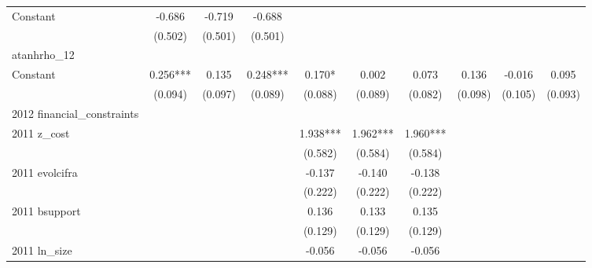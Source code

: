 \begin{table}[htbp]
\begin{tabular}{l*{9}{c}}
Constant            &      -0.686   &      -0.719   &      -0.688   &               &               &               &               &               &               \\
                    &     (0.502)   &     (0.501)   &     (0.501)   &               &               &               &               &               &               \\
\hline
atanhrho\_12         &               &               &               &               &               &               &               &               &               \\
Constant            &       0.256***&       0.135   &       0.248***&       0.170*  &       0.002   &       0.073   &       0.136   &      -0.016   &       0.095   \\
                    &     (0.094)   &     (0.097)   &     (0.089)   &     (0.088)   &     (0.089)   &     (0.082)   &     (0.098)   &     (0.105)   &     (0.093)   \\
\hline
2012 financial\_constraints&               &               &               &               &               &               &               &               &               \\
2011 z\_cost         &               &               &               &       1.938***&       1.962***&       1.960***&               &               &               \\
                    &               &               &               &     (0.582)   &     (0.584)   &     (0.584)   &               &               &               \\
2011 evolcifra      &               &               &               &      -0.137   &      -0.140   &      -0.138   &               &               &               \\
                    &               &               &               &     (0.222)   &     (0.222)   &     (0.222)   &               &               &               \\
2011 bsupport       &               &               &               &       0.136   &       0.133   &       0.135   &               &               &               \\
                    &               &               &               &     (0.129)   &     (0.129)   &     (0.129)   &               &               &               \\
2011 ln\_size        &               &               &               &      -0.056   &      -0.056   &      -0.056   &               &               &               \\

\end{tabular}
\end{table}
